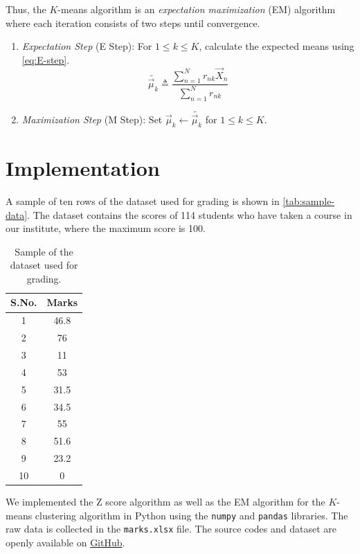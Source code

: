 \documentclass[conference]{IEEEtran}
\begin{document}
Thus, the $K$-means algorithm is an \emph{expectation maximization} (EM)
algorithm where each iteration consists of two steps until convergence.
\begin{enumerate}
    \item \emph{Expectation Step} (E Step): For $1 \le k \le K$, calculate the
    expected means using \eqref{eq:E-step}.
    \begin{equation}
        \tilde{\vec{\mu}_k} \triangleq \frac{\sum_{n=1}^Nr_{nk}\vec{X}_n}{\sum_{n=1}^Nr_{nk}}
        \label{eq:E-step}
    \end{equation}
    \item \emph{Maximization Step} (M Step): Set $\vec{\mu}_k \leftarrow
    \tilde{\vec{\mu}_k}$ for $1 \le k \le K$.
\end{enumerate}

\section{Implementation}
\label{sec:implementation}

A sample of ten rows of the dataset used for grading is shown in
\autoref{tab:sample-data}. The dataset contains the scores of 114 students who
have taken a course in our institute, where the maximum score is 100.
\begin{table}[!ht]
    \centering
    \begin{tabular}{|c|c|}
        \hline
        \textbf{S.No.} & \textbf{Marks} \\
        \hline
        1 & 46.8 \\
        \hline
        2 & 76 \\
        \hline
        3 & 11 \\
        \hline
        4 & 53 \\
        \hline
        5 & 31.5 \\
        \hline
        6 & 34.5 \\
        \hline
        7 & 55 \\
        \hline
        8 & 51.6 \\
        \hline
        9 & 23.2 \\
        \hline
        10 & 0 \\
        \hline
    \end{tabular}
    \caption{Sample of the dataset used for grading.}
    \label{tab:sample-data}
\end{table}

We implemented the Z score algorithm as well as the EM algorithm for the
$K$-means clustering algorithm in Python using the \texttt{numpy} and
\texttt{pandas} libraries. The raw data is collected in the \texttt{marks.xlsx}
file. The source codes and dataset are openly available on
\href{https://github.com/gadepall/grading}{GitHub}.
\end{document}
